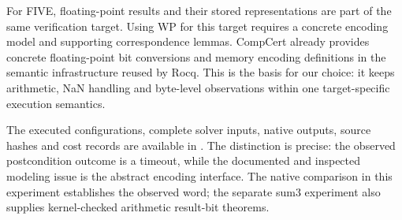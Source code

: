 \documentclass[manuscript, screen, review]{acmart}
\begin{document}
For FIVE, floating-point results and their stored representations are part
of the same verification target. Using WP for this target requires a
concrete encoding model and supporting correspondence lemmas. CompCert
already provides concrete floating-point bit conversions and memory
encoding definitions in the semantic infrastructure reused by Rocq.
This is the basis for our choice: it keeps arithmetic, NaN handling and
byte-level observations within one target-specific execution semantics.

The executed configurations, complete solver inputs, native outputs,
source hashes and cost records are available in
. The distinction is precise: the
observed postcondition outcome is a timeout, while the documented and
inspected modeling issue is the abstract encoding interface. The native
comparison in this experiment establishes the observed word; the separate
sum3 experiment also supplies kernel-checked arithmetic result-bit theorems.
\end{document}
